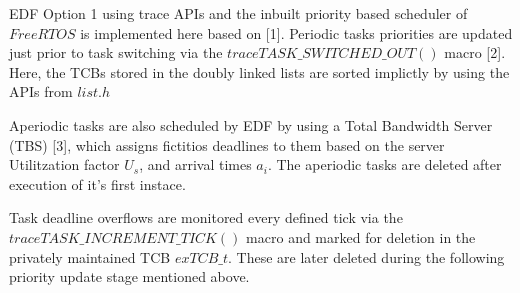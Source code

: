 \documentclass[10pt]{beamer}
\begin{document}
\begin{frame}
	\footnotesize{
		 EDF Option 1 using trace APIs and the inbuilt priority based scheduler of $FreeRTOS$ is implemented here based on [1].
		 Periodic tasks priorities are updated just prior to task switching via the $traceTASK\_SWITCHED\_OUT()$ macro [2]. 
		 Here, the TCBs stored in the doubly linked lists are sorted implictly by using the APIs from $list.h$

		 \hfill\break
		 Aperiodic tasks are also scheduled by EDF by using a Total Bandwidth Server (TBS) [3], 
		 which assigns fictitios deadlines to them based on the server Utilitzation factor $U_{s}$, and arrival times $a_{i}$. 
		 The aperiodic tasks are deleted after execution of it's first instace. 

		 \hfill\break
		 Task deadline overflows are monitored every defined tick via the $traceTASK\_INCREMENT\_TICK()$ macro and marked for deletion 
		 in the privately maintained TCB $exTCB\_t$. 
		 These are later deleted during the following priority update stage mentioned above.
		 }%
\end{frame}


\end{document}
